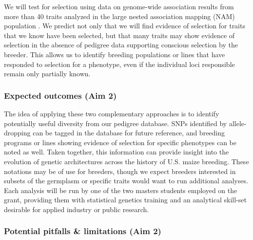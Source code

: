 \documentclass[12pt]{article}
\begin{document}
We will test for selection using data on genome-wide association results from more than 40 traits analyzed in the large nested association mapping (NAM) population \citep{wallace2014association}.  
We predict not only that we will find evidence of selection for traits that we know have been selected, but that many traits may show evidence of selection in the absence of pedigree data supporting conscious selection by the breeder.
This allows us to identify breeding populations or lines that have responded to selection for a phenotype, even if the individual loci responsible remain only partially known.


\subsubsection*{Expected outcomes (Aim 2)}

The idea of applying these two complementary approaches is to identify potentially useful diversity from our pedigree database.
SNPs identified by allele-dropping can be tagged in the database for future reference, and breeding programs or lines showing evidence of selection for specific phenotypes can be noted as well.
Taken together, this information can provide insight into the evolution of genetic architectures across the history of U.S. maize breeding.
These notations may be of use for breeders, though we expect breeders interested in subsets of the germplasm or specific traits would want to run additional analyses.
Each analysis will be run by one of the two masters students employed on the grant, providing them with statistical genetics training and an analytical skill-set desirable for applied industry or public research. 

\subsubsection*{Potential pitfalls \& limitations (Aim 2)}
\end{document}
